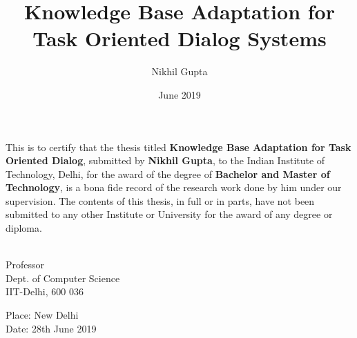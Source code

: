 \documentclass[Dual]{iitddiss}
\begin{document}


\title{Knowledge Base Adaptation for \\ Task Oriented Dialog Systems}

\author{Nikhil Gupta}
\date{June 2019}

\maketitle

\certificate

\vspace*{0.5in}

\noindent This is to certify that the thesis titled {\bf Knowledge Base Adaptation for Task Oriented Dialog}, submitted by {\bf Nikhil Gupta},
  to the Indian Institute of Technology, Delhi, for
the award of the degree of {\bf Bachelor and Master of Technology}, is a bona fide
record of the research work done by him under our supervision.  The
contents of this thesis, in full or in parts, have not been submitted
to any other Institute or University for the award of any degree or
diploma.

\vspace*{1.5in}

\begin{singlespacing}
\hspace*{-0.25in}
\parbox{2.5in}{
 \\
\noindent Professor \\
\noindent Dept. of Computer Science\\
\noindent IIT-Delhi, 600 036 \\
}
\hspace*{1.0in}
\end{singlespacing}
\vspace*{0.25in}
\noindent Place: New Delhi\\
Date: 28th June 2019


\acknowledgements

\pagebreak

\end{document}
